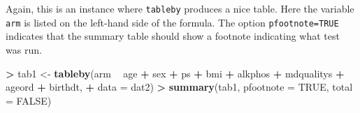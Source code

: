 \documentclass[
]{book}
\newenvironment{Shaded}{\begin{snugshade}}{\end{snugshade}}
\newcommand{\DataTypeTok}[1]{\textcolor[rgb]{0.13,0.29,0.53}{#1}}
\newcommand{\KeywordTok}[1]{\textcolor[rgb]{0.13,0.29,0.53}{\textbf{#1}}}
\newcommand{\NormalTok}[1]{#1}
\newcommand{\OperatorTok}[1]{\textcolor[rgb]{0.81,0.36,0.00}{\textbf{#1}}}
\newcommand{\OtherTok}[1]{\textcolor[rgb]{0.56,0.35,0.01}{#1}}
\newcommand{\StringTok}[1]{\textcolor[rgb]{0.31,0.60,0.02}{#1}}
\begin{document}
Again, this is an instance where \texttt{tableby} produces a nice table. Here the variable \texttt{arm} is listed on the left-hand side of the formula. The option \texttt{pfootnote=TRUE} indicates that the summary table should show a footnote indicating what test was run.

\begin{Shaded}
\begin{Highlighting}[]
\OperatorTok{>}\StringTok{ }\NormalTok{tab1 <-}\StringTok{ }\KeywordTok{tableby}\NormalTok{(arm }\OperatorTok{~}\StringTok{ }\NormalTok{age }\OperatorTok{+}\StringTok{ }\NormalTok{sex }\OperatorTok{+}\StringTok{ }\NormalTok{ps }\OperatorTok{+}\StringTok{ }\NormalTok{bmi }\OperatorTok{+}\StringTok{ }\NormalTok{alkphos }\OperatorTok{+}\StringTok{ }\NormalTok{mdqualitys }\OperatorTok{+}\StringTok{ }\NormalTok{ageord }\OperatorTok{+}\StringTok{ }\NormalTok{birthdt, }
\OperatorTok{+}\StringTok{     }\DataTypeTok{data =}\NormalTok{ dat2)}
\OperatorTok{>}\StringTok{ }\KeywordTok{summary}\NormalTok{(tab1, }\DataTypeTok{pfootnote =} \OtherTok{TRUE}\NormalTok{, }\DataTypeTok{total =} \OtherTok{FALSE}\NormalTok{)}
\end{Highlighting}
\end{Shaded}
\end{document}
